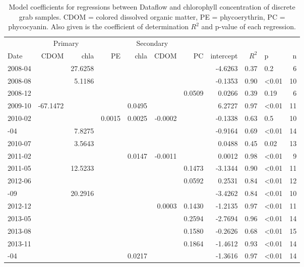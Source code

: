 \begin{table}

\caption{\label{tab:}Model coefficients for regressions between Dataflow and chlorophyll concentration of discrete grab samples. CDOM = colored dissolved organic matter, PE = phycoerythrin, PC = phycocyanin. Also given is the coefficient of determination $R^2$ and p-value of each regression.}
\centering
\begin{tabular}[t]{lrrrrrrrrlr}
\toprule
\multicolumn{1}{c}{ } & \multicolumn{2}{c}{Primary} & \multicolumn{4}{c}{Secondary} \\ \cmidrule(l{2pt}r{2pt}){2-3} \cmidrule(l{2pt}r{2pt}){4-7}
Date & CDOM & chla & PE & chla & CDOM & PC & intercept & $R^2$ & p & n\\
\midrule
2008-04 &  & 27.6258 &  &  &  &  & -4.6263 & 0.37 & 0.2 & 6\\
2008-08 &  & 5.1186 &  &  &  &  & -0.1353 & 0.90 & \textless0.01 & 10\\
2008-12 &  &  &  &  &  & 0.0509 & 0.0266 & 0.39 & 0.19 & 6\\
2009-10 & -67.1472 &  &  & 0.0495 &  &  & 6.2727 & 0.97 & \textless0.01 & 11\\
2010-02 &  &  & 0.0015 & 0.0025 & -0.0002 &  & -0.1338 & 0.63 & 0.5 & 10\\
\addlinespace
2010-04 &  & 7.8275 &  &  &  &  & -0.9164 & 0.69 & \textless0.01 & 14\\
2010-07 &  & 3.5643 &  &  &  &  & 0.0488 & 0.45 & 0.02 & 13\\
2011-02 &  &  &  & 0.0147 & -0.0011 &  & 0.0012 & 0.98 & \textless0.01 & 9\\
2011-05 &  & 12.5233 &  &  &  & 0.1473 & -3.1344 & 0.90 & \textless0.01 & 11\\
2012-06 &  &  &  &  &  & 0.0592 & 0.2531 & 0.84 & \textless0.01 & 12\\
\addlinespace
2012-09 &  & 20.2916 &  &  &  &  & -3.4262 & 0.84 & \textless0.01 & 10\\
2012-12 &  &  &  &  & 0.0003 & 0.1430 & -1.2135 & 0.97 & \textless0.01 & 11\\
2013-05 &  &  &  &  &  & 0.2594 & -2.7694 & 0.96 & \textless0.01 & 14\\
2013-08 &  &  &  &  &  & 0.1580 & -0.2626 & 0.68 & \textless0.01 & 15\\
2013-11 &  &  &  &  &  & 0.1864 & -1.4612 & 0.93 & \textless0.01 & 14\\
\addlinespace
2014-04 &  &  &  & 0.0217 &  &  & -1.3616 & 0.97 & \textless0.01 & 14\\

\end{tabular}
\end{table}
